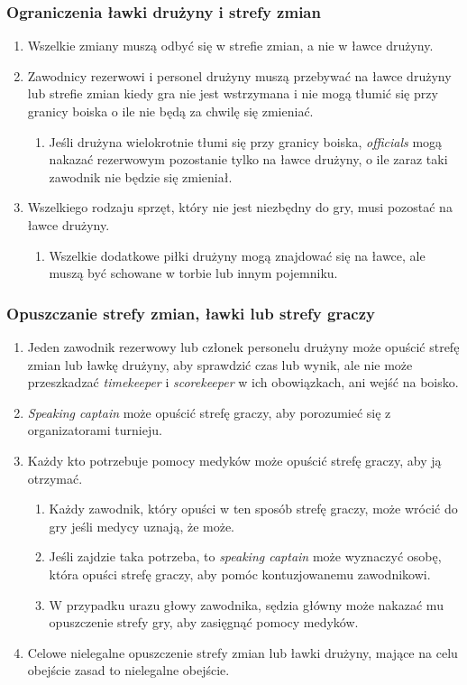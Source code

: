 \documentclass[11pt,a4paper]{article}
\begin{document}
\subsubsection{Ograniczenia ławki drużyny i strefy zmian}
\begin{enumerate}
  \item Wszelkie zmiany muszą odbyć się w strefie zmian, a nie w ławce drużyny.
  \item Zawodnicy rezerwowi i personel drużyny muszą przebywać na ławce drużyny lub strefie zmian kiedy gra nie jest wstrzymana i nie mogą tłumić się przy granicy boiska o ile nie będą za chwilę się zmieniać.
  \begin{enumerate}
    \item Jeśli drużyna wielokrotnie tłumi się przy granicy boiska, \emph{officials} mogą nakazać rezerwowym pozostanie tylko na ławce drużyny, o ile zaraz taki zawodnik nie będzie się zmieniał.
  \end{enumerate}
  \item Wszelkiego rodzaju sprzęt, który nie jest niezbędny do gry, musi pozostać na ławce drużyny.
  \begin{enumerate}
    \item Wszelkie dodatkowe piłki drużyny mogą znajdować się na ławce, ale muszą być schowane w torbie lub innym pojemniku.
  \end{enumerate}
\end{enumerate}

\subsubsection{Opuszczanie strefy zmian, ławki lub strefy graczy}
\begin{enumerate}
  \item Jeden zawodnik rezerwowy lub członek personelu drużyny może opuścić strefę zmian lub ławkę drużyny, aby sprawdzić czas lub wynik, ale nie może przeszkadzać \emph{timekeeper} i \emph{scorekeeper} w ich obowiązkach, ani wejść na boisko.
  \item \emph{Speaking captain} może opuścić strefę graczy, aby porozumieć się z organizatorami turnieju.
  \item Każdy kto potrzebuje pomocy medyków może opuścić strefę graczy, aby ją otrzymać.
  \begin{enumerate}
    \item Każdy zawodnik, który opuści w ten sposób strefę graczy, może wrócić do gry jeśli medycy uznają, że może.
    \item Jeśli zajdzie taka potrzeba, to \emph{speaking captain} może wyznaczyć osobę, która opuści strefę graczy, aby pomóc kontuzjowanemu zawodnikowi.
    \item W przypadku urazu głowy zawodnika, sędzia główny może nakazać mu opuszczenie strefy gry, aby zasięgnąć pomocy medyków.
  \end{enumerate}
  \item Celowe nielegalne opuszczenie strefy zmian lub ławki drużyny, mające na celu obejście zasad to nielegalne obejście.
\end{enumerate}
\end{document}
